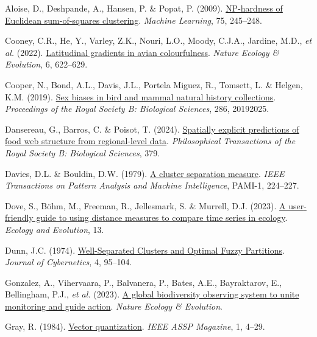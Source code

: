 \documentclass[
  letterpaper,
]{scrbook}
\newlength{\cslhangindent}
\newenvironment{CSLReferences}[2] %
 {\begin{list}{}{%
  \setlength{\itemindent}{0pt}
  \setlength{\leftmargin}{0pt}
  \setlength{\parsep}{0pt}
  \ifodd #1
   \setlength{\leftmargin}{\cslhangindent}
   \setlength{\itemindent}{-1\cslhangindent}
  \fi
  \setlength{\itemsep}{#2\baselineskip}}}
 {\end{list}}
\begin{document}
\begin{CSLReferences}{1}{0}
Aloise, D., Deshpande, A., Hansen, P. \& Popat, P. (2009).
\href{https://doi.org/10.1007/s10994-009-5103-0}{NP-hardness of
Euclidean sum-of-squares clustering}. \emph{Machine Learning}, 75,
245--248.

Cooney, C.R., He, Y., Varley, Z.K., Nouri, L.O., Moody, C.J.A., Jardine,
M.D., \emph{et al.} (2022).
\href{https://doi.org/10.1038/s41559-022-01714-1}{Latitudinal gradients
in avian colourfulness}. \emph{Nature Ecology \& Evolution}, 6,
622--629.

Cooper, N., Bond, A.L., Davis, J.L., Portela Miguez, R., Tomsett, L. \&
Helgen, K.M. (2019). \href{https://doi.org/10.1098/rspb.2019.2025}{Sex
biases in bird and mammal natural history collections}.
\emph{Proceedings of the Royal Society B: Biological Sciences}, 286,
20192025.

Dansereau, G., Barros, C. \& Poisot, T. (2024).
\href{https://doi.org/10.1098/rstb.2023.0166}{Spatially explicit
predictions of food web structure from regional-level data}.
\emph{Philosophical Transactions of the Royal Society B: Biological
Sciences}, 379.

Davies, D.L. \& Bouldin, D.W. (1979).
\href{https://doi.org/10.1109/tpami.1979.4766909}{A cluster separation
measure}. \emph{IEEE Transactions on Pattern Analysis and Machine
Intelligence}, PAMI-1, 224--227.

Dove, S., Böhm, M., Freeman, R., Jellesmark, S. \& Murrell, D.J. (2023).
\href{https://doi.org/10.1002/ece3.10520}{A user{-}friendly guide to
using distance measures to compare time series in ecology}.
\emph{Ecology and Evolution}, 13.

Dunn, J.C. (1974).
\href{https://doi.org/10.1080/01969727408546059}{Well-Separated Clusters
and Optimal Fuzzy Partitions}. \emph{Journal of Cybernetics}, 4,
95--104.

Gonzalez, A., Vihervaara, P., Balvanera, P., Bates, A.E., Bayraktarov,
E., Bellingham, P.J., \emph{et al.} (2023).
\href{https://doi.org/10.1038/s41559-023-02171-0}{A global biodiversity
observing system to unite monitoring and guide action}. \emph{Nature
Ecology \& Evolution}.

Gray, R. (1984).
\href{https://doi.org/10.1109/massp.1984.1162229}{Vector quantization}.
\emph{IEEE ASSP Magazine}, 1, 4--29.


\end{CSLReferences}
\end{document}
